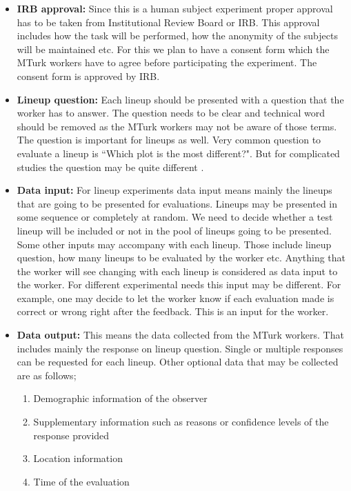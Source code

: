 \documentclass[11pt]{article}
\begin{document}
\begin{itemize}

\item {\bf IRB approval:} Since this is a human subject experiment proper approval has to be taken from Institutional Review Board or IRB. This approval includes how the task will be performed, how the anonymity of the subjects will be maintained etc. For this we plan to have a consent form which the MTurk workers have to agree before participating the experiment. The consent form is approved by IRB.
 
\item {\bf Lineup question:} Each lineup should be presented with a question that the worker has to answer. The question needs to be clear and technical word should be removed as the MTurk workers may not be aware of those terms. The question is important for lineups as well. Very common question to evaluate a lineup is ``Which plot is the most different?". But for complicated studies the question may be quite different \citep{majumder:socio}.

\item {\bf Data input:} For lineup experiments data input means mainly the lineups that are going to be presented for evaluations. Lineups may be presented in some sequence or completely at random. We need to decide whether a test lineup will be included or not in the pool of lineups going to be presented. Some other inputs may accompany with each lineup. Those include lineup question, how many lineups to be evaluated by the worker etc. Anything that the worker will see changing with each lineup is considered as data input to the worker. For different experimental needs this input may be different. For example, one may decide to let the worker know if each evaluation made is correct or wrong right after the feedback. This is an input for the worker.

\item {\bf Data output:} This means the data collected from the MTurk workers. That includes mainly the response on lineup question. Single or multiple responses can be requested for each lineup. Other optional data that may be collected are as follows;

\begin{enumerate}
\item Demographic information of the observer
\item Supplementary information such as reasons or confidence levels of the response provided
\item Location information
\item Time of the evaluation
\end{enumerate}


\end{itemize}
\end{document}
